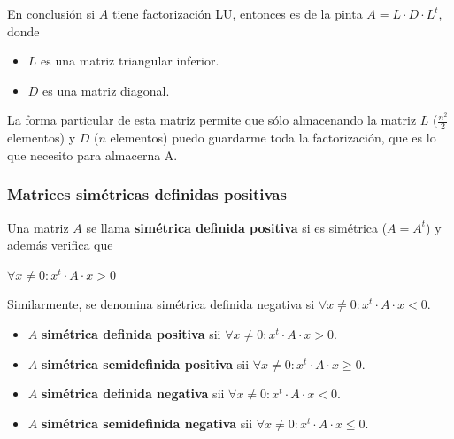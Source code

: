 \documentclass[]{article}
\begin{document}
En conclusión si $A$ tiene factorización LU, entonces es de la pinta $A=L\cdot D \cdot L^t$, donde
\begin{itemize}
	\item $L$ es una matriz triangular inferior.
	\item $D$ es una matriz diagonal.
\end{itemize}

La forma particular de esta matriz permite que sólo almacenando la matriz $L$ ($\frac{n^2}{2}$ elementos) y $D$ ($n$ elementos) puedo guardarme toda la factorización, que es lo que necesito para almacerna A.

\subsubsection{Matrices simétricas definidas positivas}
\begin{defi}
	Una matriz $A$ se llama \textbf{simétrica definida positiva} si es simétrica ($A = A^t$) y además verifica que
	\begin{center}
		$\forall x\neq 0 : x^t \cdot A \cdot x > 0$
	\end{center}

	Similarmente, se denomina simétrica definida negativa si $\forall x\neq 0 : x^t \cdot A \cdot x < 0$.

	\begin{itemize}
		\item $A$ \textbf{simétrica definida positiva} sii $\forall x\neq 0 : x^t \cdot A \cdot x > 0$.
		\item $A$ \textbf{simétrica semidefinida positiva} sii $\forall x\neq 0 : x^t \cdot A \cdot x \geq 0$.
		\item $A$ \textbf{simétrica definida negativa} sii $\forall x\neq 0 : x^t \cdot A \cdot x < 0$.
		\item $A$ \textbf{simétrica semidefinida negativa} sii $\forall x\neq 0 : x^t \cdot A \cdot x \leq 0$.
	\end{itemize}
\end{defi}
\end{document}
